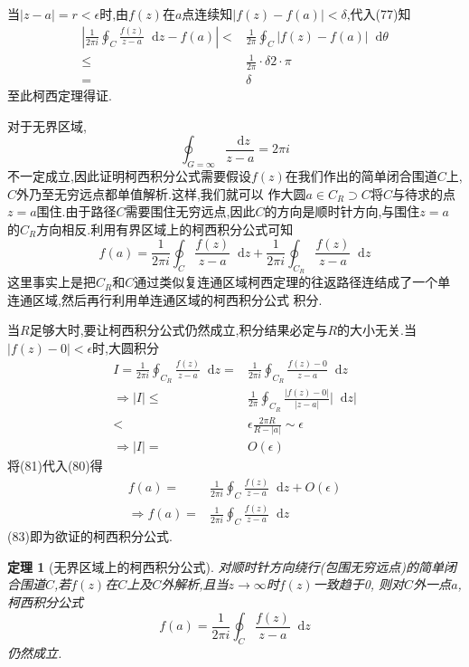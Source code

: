 \documentclass[UTF8]{ctexart}
\newcommand{\dif}{\mathop{}\!\mathrm{d}}
\newtheorem{theorem}{定理}
\begin{document}
当$\left| z-a \right|=r<\epsilon $时,由$f(z)$在$a$点连续知$\left| f(z)-f(a) \right|<\delta $,代入(77)知
\begin{align}
  \label{*}
  \left|\frac{1}{2\pi i} \oint_{C} \frac{f(z)}{z-a}\dif z-f(a) \right|<&\frac{1}{2\pi}\oint_{C}^{}\left| f(z)-f(a) \right|\dif \theta \\
  \leqslant&\frac{1}{2\pi}\cdot \delta 2 \cdot \pi \\
  =&\delta
\end{align}
至此柯西定理得证.

对于无界区域,
\begin{equation}
  \oint_{G=\infty}^{}\frac{\dif z}{z-a}=2\pi i
\end{equation}
不一定成立,因此证明柯西积分公式需要假设$f(z)$在我们作出的简单闭合围道$C$上,$C$外乃至无穷远点都单值解析.这样,我们就可以
作大圆$a\in C_{R}\supset C$将$C$与待求的点$z=a$围住.由于路径$C$需要围住无穷远点,因此$C$的方向是顺时针方向,与围住$z=a$
的$C_{R}$方向相反.利用有界区域上的柯西积分公式可知
\begin{equation}
  f(a)=\frac{1}{2\pi i}\oint_{C}^{}\frac{f(z)}{z-a}\dif z+\frac{1}{2\pi i}\oint_{C_{R}}^{}\frac{f(z)}{z-a}\dif z
\end{equation}
这里事实上是把$C_{R}$和$C$通过类似复连通区域柯西定理的往返路径连结成了一个单连通区域,然后再行利用单连通区域的柯西积分公式
积分.

当$R$足够大时,要让柯西积分公式仍然成立,积分结果必定与$R$的大小无关.当$\left| f(z)-0 \right|<\epsilon $时,大圆积分
\begin{equation}
  \begin{aligned}
    I=\frac{1}{2\pi i}\oint_{C_{R}}^{}\frac{f(z)}{z-a}\dif z=&\frac{1}{2\pi i}\oint_{C_{R}}^{}\frac{f(z)-0}{z-a}\dif z \\
    \Rightarrow \left| I  \right|\leqslant&\frac{1}{2\pi} \oint_{C_{R}}^{}\frac{\left| f(z)-0 \right| }{\left| z-a \right| }\left| \dif z \right| \\
    <&\epsilon \frac{2\pi R}{R-\left| a \right| }\sim \epsilon \\
    \Rightarrow \left| I \right|=&O(\epsilon )
  \end{aligned}
\end{equation}
将(81)代入(80)得
\begin{align}
  \label{1}
  f(a)=&\frac{1}{2\pi i}\oint_{C}^{}\frac{f(z)}{z-a}\dif z+O(\epsilon ) \\
  \Rightarrow f(a)=&\frac{1}{2\pi i}\oint_{C}^{}\frac{f(z)}{z-a}\dif z
\end{align}
(83)即为欲证的柯西积分公式.
\begin{theorem}[无界区域上的柯西积分公式]
  对\textit{顺时针方向绕行}(包围无穷远点)的简单闭合围道$C$,若$f(z)$在$C$上及$C$外解析,且当$z \rightarrow \infty $时$f(z)$一致趋于0,
  则对$C$外一点$a$,柯西积分公式
  \begin{equation}
    f(a)=\frac{1}{2\pi i}\oint_{C}^{}\frac{f(z)}{z-a}\dif z
  \end{equation}
  仍然成立.
\end{theorem}
\end{document}
